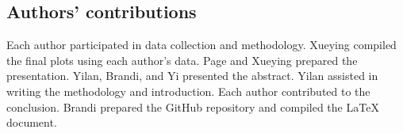\documentclass[runningheads]{llncs}
\begin{document}
\subsection*{Authors' contributions}
Each author participated in data collection and methodology. Xueying compiled the final plots using each author's data. Page and Xueying
prepared the presentation. Yilan, Brandi, and Yi presented the abstract. Yilan assisted in writing the methodology and introduction. Each
author contributed to the conclusion. Brandi prepared the GitHub repository and compiled the LaTeX document.
%
%
%



%
\end{document}
